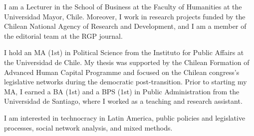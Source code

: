 




\par{I am a Lecturer in the School of Business at the Faculty of Humanities at the Universidad Mayor, Chile. Moreover, I work in research projects funded by the Chilean National Agency of Research and Development, and I am a member of the editorial team at the RGP journal. 

I hold an MA (1st) in Political Science from the Instituto for Public Affairs at the Universidad de Chile. My thesis was supported by the Chilean Formation of Advanced Human Capital Programme and focused on the Chilean congress's legislative networks during the democratic post-transition. Prior to starting my MA, I earned a BA (1st) and a BPS (1st) in Public Administration from the Universidad de Santiago, where I worked as a teaching and research assistant.

I am interested in technocracy in Latin America, public policies and legislative processes, social network analysis, and mixed methods.}\\